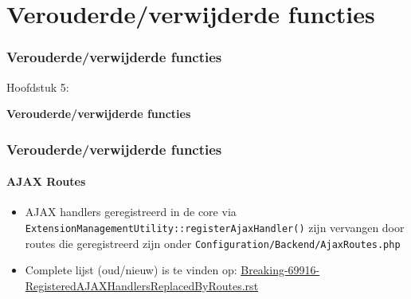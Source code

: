 %

\section{Verouderde/verwijderde functies}
\begin{frame}[fragile]
	\frametitle{Verouderde/verwijderde functies}

	\begin{center}\huge{Hoofdstuk 5:}\end{center}
	\begin{center}\huge{\color{typo3darkgrey}\textbf{Verouderde/verwijderde functies}}\end{center}

\end{frame}


\begin{frame}[fragile]
	\frametitle{Verouderde/verwijderde functies}
	\framesubtitle{AJAX Routes}

	\begin{itemize}

		\item AJAX handlers geregistreerd in de core via
			\texttt{ExtensionManagementUtility::registerAjaxHandler()}
			zijn vervangen door routes die geregistreerd zijn onder
			\texttt{Configuration/Backend/AjaxRoutes.php}

		\item Complete lijst (oud/nieuw) is te vinden op:\newline
				\href{https://forge.typo3.org/projects/typo3cms-core/repository/revisions/3f0fb6229ba391356e5ed4984eb1c9418ba6663e/entry/typo3/sysext/core/Documentation/Changelog/master/Breaking-69916-RegisteredAJAXHandlersReplacedByRoutes.rst}{Breaking-69916-RegisteredAJAXHandlersReplacedByRoutes.rst}
	\end{itemize}

\end{frame}

